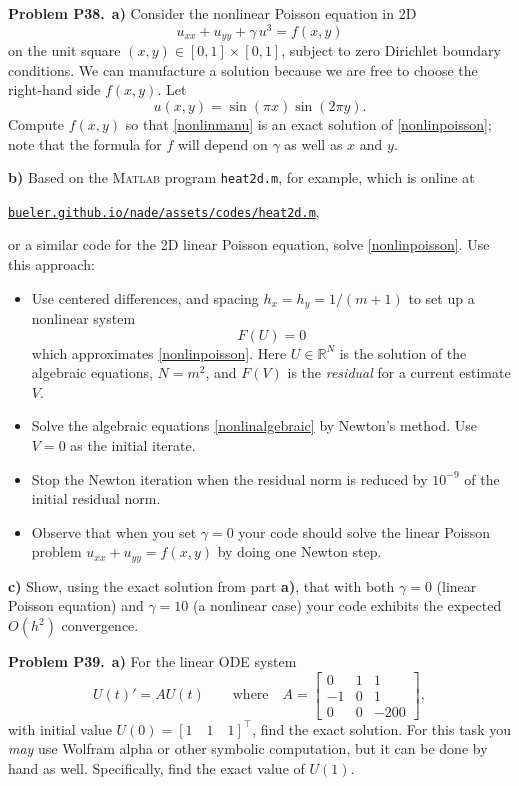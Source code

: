 \documentclass[12pt]{amsart}
\newcommand{\RR}{\mathbb{R}}
\newcommand{\Matlab}{\textsc{Matlab}\xspace}
\newcommand{\prob}[1]{\bigskip\noindent\textbf{#1}\quad }
\newcommand{\epart}[1]{\medskip\noindent\textbf{#1)}\quad }
\newcommand{\ppart}[1]{\,\textbf{#1)}\quad }
\begin{document}
\prob{Problem P38.}  \ppart{a}  Consider the nonlinear Poisson equation in 2D
\begin{equation}
    u_{xx} + u_{yy} + \gamma\, u^3 = f(x,y)  \label{nonlinpoisson}
\end{equation}
on the unit square $(x,y) \in [0,1]\times [0,1]$, subject to zero Dirichlet boundary conditions.  We can manufacture a solution because we are free to choose the right-hand side $f(x,y)$.  Let
\begin{equation}
    u(x,y) = \sin(\pi x) \sin(2\pi y).  \label{nonlinmanu}
\end{equation}
Compute $f(x,y)$ so that \eqref{nonlinmanu} is an exact solution of \eqref{nonlinpoisson}; note that the formula for $f$ will depend on $\gamma$ as well as $x$ and $y$.

\epart{b}  Based on the \Matlab program \texttt{heat2d.m}, for example, which is online at

\centerline{\href{https://bueler.github.io/nade/assets/codes/heat2d.m}{\texttt{bueler.github.io/nade/assets/codes/heat2d.m}},}

\noindent or a similar code for the 2D linear Poisson equation, solve \eqref{nonlinpoisson}.  Use this approach:
\begin{itemize}
\item Use centered differences, and spacing $h_x=h_y=1/(m+1)$ to set up a nonlinear system
\begin{equation}
    F(U) = 0  \label{nonlinalgebraic}
\end{equation}
which approximates \eqref{nonlinpoisson}.  Here $U \in \RR^N$ is the solution of the algebraic equations, $N=m^2$, and $F(V)$ is the \emph{residual} for a current estimate $V$.
\item Solve the algebraic equations \eqref{nonlinalgebraic} by Newton's method.  Use $V=0$ as the initial iterate.
\item Stop the Newton iteration when the residual norm is reduced by $10^{-9}$ of the initial residual norm.
\item Observe that when you set $\gamma=0$ your code should solve the linear Poisson problem $u_{xx} + u_{yy} = f(x,y)$ by doing one Newton step.
\end{itemize}

\epart{c}  Show, using the exact solution from part \textbf{a)}, that with both $\gamma=0$ (linear Poisson equation) and $\gamma = 10$ (a nonlinear case) your code exhibits the expected $O(h^2)$ convergence.


\prob{Problem P39.}  \ppart{a}  For the linear ODE system
\begin{equation}
U(t)' = A U(t) \qquad \text{where} \quad A = \begin{bmatrix} 0 & 1 & 1 \\ -1 & 0 & 1 \\ 0 & 0 & -200 \end{bmatrix}, \label{linodesys}
\end{equation}
with initial value $U(0)=[1\quad 1\quad 1]^\top$, find the exact solution.  For this task you \emph{may} use Wolfram alpha or other symbolic computation, but it can be done by hand as well.  Specifically, find the exact value of $U(1)$.
\end{document}
